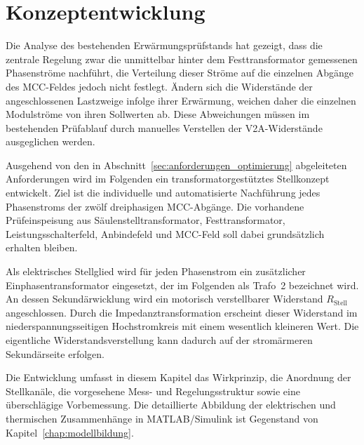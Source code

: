 \section{Konzeptentwicklung}
\label{chap:konzeptentwicklung}

Die Analyse des bestehenden Erwärmungsprüfstands hat gezeigt, dass die
zentrale Regelung zwar die unmittelbar hinter dem Festtransformator
gemessenen Phasenströme nachführt, die Verteilung dieser Ströme auf die
einzelnen Abgänge des MCC-Feldes jedoch nicht festlegt. Ändern sich die
Widerstände der angeschlossenen Lastzweige infolge ihrer Erwärmung,
weichen daher die einzelnen Modulströme von ihren Sollwerten ab. Diese
Abweichungen müssen im bestehenden Prüfablauf durch manuelles
Verstellen der V2A-Widerstände ausgeglichen werden.

Ausgehend von den in
Abschnitt~\ref{sec:anforderungen_optimierung}
abgeleiteten Anforderungen wird im Folgenden ein
transformatorgestütztes Stellkonzept entwickelt. Ziel ist die
individuelle und automatisierte Nachführung jedes Phasenstroms der
zwölf dreiphasigen MCC-Abgänge. Die vorhandene Prüfeinspeisung aus
Säulenstelltransformator, Festtransformator, Leistungsschalterfeld,
Anbindefeld und MCC-Feld soll dabei grundsätzlich erhalten bleiben.

Als elektrisches Stellglied wird für jeden Phasenstrom ein zusätzlicher
Einphasentransformator eingesetzt, der im Folgenden als Trafo~2
bezeichnet wird. An dessen Sekundärwicklung wird ein motorisch
verstellbarer Widerstand \(R_{\mathrm{Stell}}\) angeschlossen. Durch
die Impedanztransformation erscheint dieser Widerstand im
niederspannungsseitigen Hochstromkreis mit einem wesentlich kleineren
Wert. Die eigentliche Widerstandsverstellung kann dadurch auf der
stromärmeren Sekundärseite erfolgen.

Die Entwicklung umfasst in diesem Kapitel das Wirkprinzip, die
Anordnung der Stellkanäle, die vorgesehene Mess- und Regelungsstruktur
sowie eine überschlägige Vorbemessung. Die detaillierte Abbildung der
elektrischen und thermischen Zusammenhänge in MATLAB/Simulink ist
Gegenstand von Kapitel~\ref{chap:modellbildung}.


